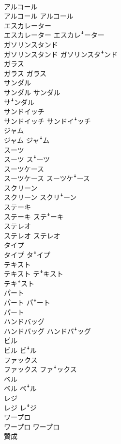 \documentclass[8pt]{extreport}
\begin{document}
\begin{CJK}{UTF8}{min}
\\	アルコール	
\\	アルコール	アルコール
\\	エスカレーター	
\\	エスカレーター	エスカレꜜーター
\\	ガソリンスタンド	
\\	ガソリンスタンド	ガソリンスタꜜンド
\\	ガラス	
\\	ガラス	ガラス
\\	サンダル	
\\	サンダル	サンダル 
\\	サꜜンダル
\\	サンドイッチ	
\\	サンドイッチ	サンドイꜜッチ
\\	ジャム	
\\	ジャム	ジャꜜム
\\	スーツ	
\\	スーツ	スꜜーツ
\\	スーツケース	
\\	スーツケース	スーツケꜜース
\\	スクリーン	
\\	スクリーン	スクリꜜーン
\\	ステーキ	
\\	ステーキ	ステꜜーキ
\\	ステレオ	
\\	ステレオ	ステレオ
\\	タイプ	
\\	タイプ	タꜜイプ
\\	テキスト	
\\	テキスト	テꜜキスト 
\\	テキꜜスト
\\	パート	
\\	パート	パꜜート 
\\	パート
\\	ハンドバッグ	
\\	ハンドバッグ	ハンドバꜜッグ
\\	ビル	
\\	ビル	ビꜜル
\\	ファックス	
\\	ファックス	ファꜜックス
\\	ベル	
\\	ベル	ベꜜル
\\	レジ	
\\	レジ	レꜜジ
\\	ワープロ	
\\	ワープロ	ワープロ
\\	賛成	

\end{CJK}
\end{document}
